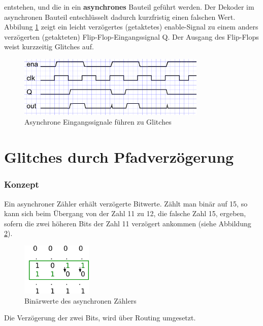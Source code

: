 entstehen, und die in ein \textbf{asynchrones} Bauteil geführt werden. Der Dekoder im asynchronen Bauteil entschlüsselt dadurch kurzfristig einen falschen Wert. \\

Abbilung \ref{fig.glitch.bild1} zeigt ein leicht verzögertes (getaktetes) enable-Signal zu einem anders verzögerten (getakteten) Flip-Flop-Eingangssignal Q. Der Ausgang des Flip-Flops weist kurzzeitig Glitches auf. \\
\begin{figure}[H]
	\includegraphics[width=0.8\textwidth]{images/glitch/def_glitch_3.png}
	\caption{Asynchrone Eingangssignale führen zu Glitches}
	\label{fig.glitch.bild1}
\end{figure}


\newpage
\section{Glitches durch Pfadverzögerung}\label{sect.glitch_detect}


\subsubsection{Konzept}
Ein asynchroner Zähler erhält verzögerte Bitwerte. Zählt man binär auf 15, so kann sich beim Übergang von der Zahl 11 zu 12, die falsche Zahl 15, ergeben, sofern die zwei höheren Bits der Zahl 11 verzögert ankommen (siehe Abbildung \ref {fig.glitch.binaer_zahlen}).

\begin{figure}[H]
	\includegraphics[width=0.3\textwidth]{images/glitch/konzept_verzoegerung.png}
	\caption{Binärwerte des asynchronen Zählers}
	\label{fig.glitch.binaer_zahlen}
\end{figure}

Die Verzögerung der zwei Bits, wird über Routing umgesetzt. 



